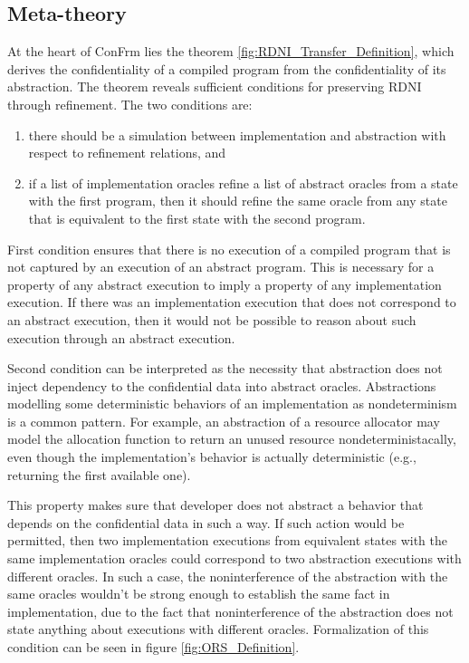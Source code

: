 \subsection{Meta-theory}
At the heart of ConFrm lies the theorem \ref{fig:RDNI_Transfer_Definition}, which derives the confidentiality of a compiled program from the confidentiality of its abstraction. The theorem reveals sufficient conditions for preserving RDNI through refinement. The two conditions are:

\begin{enumerate}
    \item there should be a simulation between implementation and abstraction with respect to refinement relations, and
    \item if a list of implementation oracles refine a list of abstract oracles from a state with the first program, then it should refine the same oracle from any state that is equivalent to the first state with the second program.
\end{enumerate}

First condition ensures that there is no execution of a compiled program that is not captured by an execution of an abstract program. This is necessary for a property of any abstract execution to imply a property of any implementation execution. If there was an implementation execution that does not correspond to an abstract execution, then it would not be possible to reason about such execution through an abstract execution.

Second condition can be interpreted as the necessity that abstraction does not inject dependency to the confidential data into abstract oracles. Abstractions modelling some deterministic behaviors of an implementation as nondeterminism is a common pattern. For example, an abstraction of a resource allocator may model the allocation function to return an unused resource nondeterministacally, even though the implementation's behavior is actually deterministic (e.g., returning the first available one). 

This property makes sure that developer does not abstract a behavior that depends on the confidential data in such a way. If such action would be permitted, then two implementation executions from equivalent states with the same implementation oracles could correspond to two abstraction executions with different oracles. In such a case, the noninterference of the abstraction with the same oracles wouldn't be strong enough to establish the same fact in implementation, due to the fact that noninterference of the abstraction does not state anything about executions with different oracles. Formalization of this condition can be seen in figure \ref{fig:ORS_Definition}.

